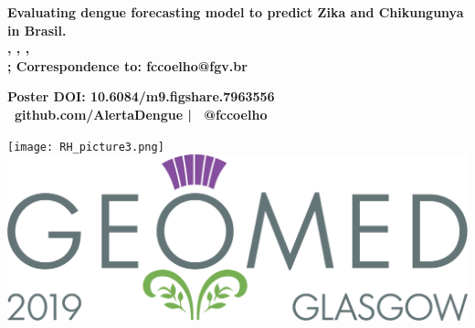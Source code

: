 \documentclass[a0,portrait]{a0poster}
\begin{document}


\begin{minipage}[b]{0.75\linewidth}
\VeryHuge \color{NavyBlue} \textbf{Evaluating dengue forecasting model to predict Zika and Chikungunya in Brasil.}
\color{Black}\\[0.4cm] 
\Large \textbf{
, 
, 
, 
} 
\\
\vspace{1cm}
\large \textbf{
; 
\large \textbf{Correspondence to: fccoelho@fgv.br}}
\begin{center}
    \large \textbf{Poster DOI: 10.6084/m9.figshare.7963556 \\ \faGithub \ github.com/AlertaDengue | \faTwitter \ @fccoelho}
\end{center}
\end{minipage}
%
\begin{minipage}[b]{0.25\linewidth}
\begin{center}
\texttt{[image: RH\_picture3.png]}\\ 
\includegraphics[width=16cm]{figures/geomed.png}\\
\end{center}
\end{minipage}

\end{document}

